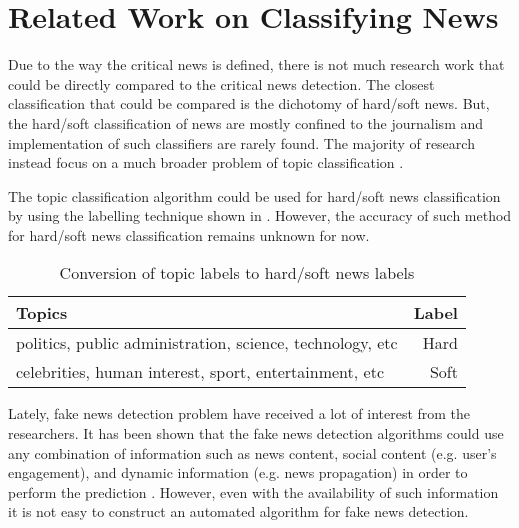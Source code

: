 \section{Related Work on Classifying News} \label{related_works}
Due to the way the critical news is defined, there is not much research work that could be directly compared to the critical news detection. The closest classification that could be compared is the dichotomy of hard/soft news. But, the hard/soft classification of news are mostly confined to the journalism and implementation of such classifiers are rarely found. The majority of research instead focus on a much broader problem of topic classification \cite{wang2012baselines, lee2011twitter, joachims1998text, nigam2000text}.

The topic classification algorithm could be used for hard/soft news classification by using the labelling technique shown in . However, the accuracy of such method for hard/soft news classification remains unknown for now.

\begin{table}[h]
\begin{center}
\caption{Conversion of topic labels to hard/soft news labels}
\label{tbl:topics_to_hard_soft}
\begin{tabular}{lr}
\toprule 
Topics&Label \\
\midrule 
politics, public administration, science, technology, etc & Hard\\
celebrities, human interest, sport, entertainment, etc & Soft\\
\bottomrule
\end{tabular}
\end{center}
\end{table}

Lately, fake news detection problem have received a lot of interest from the researchers. It has been shown that the fake news detection algorithms could use any combination of information such as news content, social content (e.g. user's engagement), and dynamic information (e.g. news propagation) in order to perform the prediction \cite{shu2018fakenewsnet}. However, even with the availability of such information it is not easy to construct an automated algorithm for fake news detection\cite{shu2017fake}.

